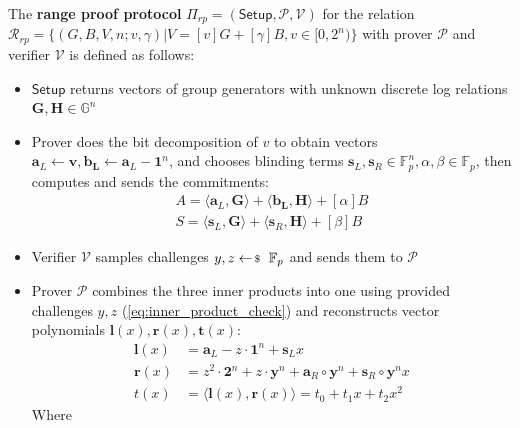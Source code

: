 \documentclass[../../book.tex]{subfiles}
\begin{document}
\begin{definition}
    The \textbf{range proof protocol} $\Pi_{rp} = (\mathsf{Setup}, \mathcal{P,V})$ for the relation $\mathcal{R}_{rp} = \{ (G, B, V, n; v, \gamma) \vert V = [v]G + [\gamma]B, v \in [0, 2^n) \}$ with prover $\mathcal{P}$ and verifier $\mathcal{V}$ is defined as follows:
    \begin{itemize}
        \item $\mathsf{Setup}$ returns vectors of group generators with unknown discrete log relations $\mathbf{G, H} \in \mathbb{G}^n$
        \item Prover does the bit decomposition of $v$ to obtain vectors $\mathbf{a}_L \gets \mathbf{v}, \mathbf{b_L} \gets \mathbf{a}_L - \mathbf{1}^n$, and chooses blinding terms $\mathbf{s}_L, \mathbf{s}_R \in \mathbb{F}_p^n, \alpha, \beta \in \mathbb{F}_p$, then computes and sends the commitments:
            \begin{align*}
                A = \langle \mathbf{a}_L, \mathbf{G} \rangle + \langle \mathbf{b_L}, \mathbf{H} \rangle + [\alpha]B\\
                S = \langle \mathbf{s}_L, \mathbf{G} \rangle + \langle \mathbf{s}_R, \mathbf{H} \rangle + [\beta]B
            \end{align*}
        \item Verifier $\mathcal{V}$ samples challenges $y, z \leftarrowS \mathbb{F}_p$ and sends them to $\mathcal{P}$
        \item Prover $\mathcal{P}$ combines the three inner products into one using provided challenges $y,z$ (\ref{eq:inner_product_check}) and reconstructs vector  polynomials $\mathbf{l}(x), \mathbf{r}(x), \mathbf{t}(x)$:
            \begin{equation*}
                \begin{aligned}
                    \mathbf{l}(x) &= \mathbf{a}_L - z \cdot \mathbf{1}^n + \mathbf{s}_L x\\
                    \mathbf{r}(x) &= z^2 \cdot \mathbf{2}^n + z \cdot \mathbf{y}^n + \mathbf{a}_R \circ \mathbf{y}^n + \mathbf{s}_R \circ \mathbf{y}^n x\\
                    t(x) &= \langle \mathbf{l}(x), \mathbf{r}(x) \rangle = t_0 + t_1 x + t_2 x^2
                \end{aligned}
            \end{equation*}
            Where 
            \begin{equation*}
                \begin{aligned}

\end{aligned}
\end{equation*}
\end{itemize}
\end{definition}
\end{document}
